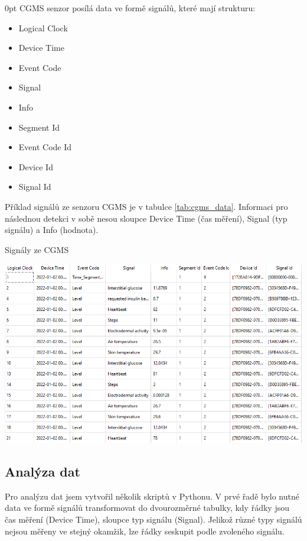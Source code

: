 \begin{setlength}{\parskip}{0pt}
CGMS senzor posílá data ve formě signálů, které mají strukturu:
\begin{itemize}
\setlength\itemsep{0em}
\item Logical Clock
\item Device Time
\item Event Code
\item Signal
\item Info
\item Segment Id
\item Event Code Id
\item Device Id
\item Signal Id
\end{itemize}
\end{setlength}

Příklad signálů ze senzoru CGMS je v tabulce \ref{tab:cgms_data}. Informaci pro následnou detekci v sobě nesou sloupce Device Time (čas měření), Signal (typ signálu) a Info (hodnota).

\begin{table}[H]
\caption{Signály ze CGMS}
\label{tab:cgms_data}
\centering
\includegraphics[width=1\textwidth]{img/cho/cgms_data.png}
\end{table}

\subsection{Analýza dat}

Pro analýzu dat jsem vytvořil několik skriptů v Pythonu. V prvé řadě bylo nutné data ve formě signálů transformovat do dvourozměrné tabulky, kdy řádky jsou čas měření (Device Time), sloupce typ signálu (Signal). Jelikož různé typy signálů nejsou měřeny ve stejný okamžik, lze řádky seskupit podle zvoleného signálu.

